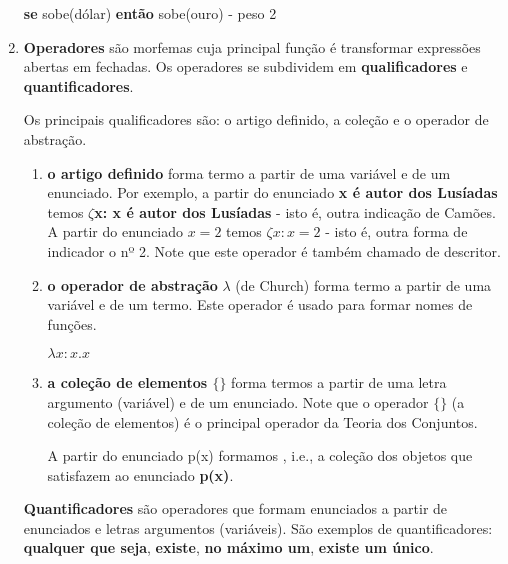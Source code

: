 \begin{enumerate}[label=\arabic*)]
        \begin{exemplo}
            \textbf{se} sobe(dólar) \textbf{então} sobe(ouro) - peso 2 %
        \end{exemplo}
    \item \textbf{Operadores} são morfemas cuja principal função é transformar expressões abertas em fechadas. Os operadores se subdividem em \textbf{qualificadores} e \textbf{quantificadores}.

    Os principais qualificadores são: o artigo definido, a coleção e o operador de abstração.

    \begin{enumerate}[label={\textbf{--}}]
        \item \textbf{o artigo definido} forma termo a partir de uma variável e de um enunciado. Por exemplo, a partir do enunciado \textbf{x é autor dos Lusíadas} temos \textbf{$\zeta$x: x é autor dos Lusíadas} - isto é, outra indicação de Camões. A partir do enunciado \textbf{$x = 2$} temos $\zeta x: x = 2$ - isto é, outra forma de indicador o nº 2. Note que este operador é também chamado de descritor.

        \item \textbf{o operador de abstração} $\lambda$ (de Church) forma termo a partir de uma variável e de um termo. Este operador é usado para formar nomes de funções.

        \setcounter{exemplo}{0}
        \begin{exemplo}
            $\lambda x: x.x$
        \end{exemplo}

        \item \textbf{a coleção de elementos $\{ \}$} forma termos a partir de uma letra argumento (variável) e de um enunciado.
        Note que o operador $\{ \}$ (a coleção de elementos) é o principal operador da Teoria dos Conjuntos.

        A partir do enunciado p(x) formamos , i.e., a coleção dos objetos que satisfazem ao enunciado \textbf{p(x)}. %
    \end{enumerate}

    \textbf{Quantificadores} são operadores que formam enunciados a partir de enunciados e letras argumentos (variáveis). São exemplos de quantificadores: \textbf{qualquer que seja}, \textbf{existe}, \textbf{no máximo um}, \textbf{existe um único}.


\end{enumerate}
